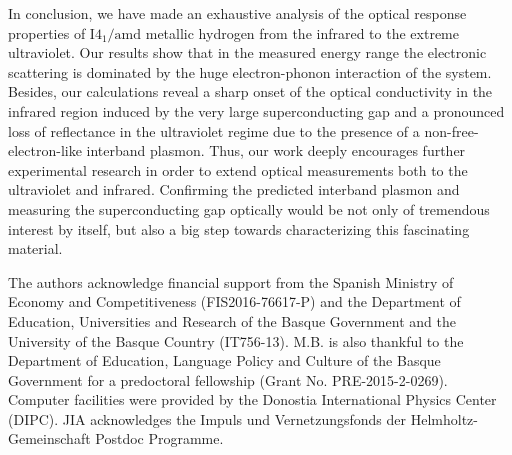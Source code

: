 \documentclass[%
 reprint,
superscriptaddress,
 amsmath,amssymb,
 aps,
prb,
floatfix,
]{revtex4-1}
\begin{document}


In conclusion, we have made an exhaustive analysis of the optical
response properties of $\mathrm{I4_1/amd}$ metallic hydrogen from the infrared to 
the extreme ultraviolet. Our results show that in the measured
energy range\cite{Diaseaal1579} the electronic scattering is dominated by the huge electron-phonon interaction
of the system. Besides, our calculations reveal a sharp onset of the optical conductivity in the infrared region
induced by the very large superconducting gap and a pronounced loss of reflectance in the ultraviolet regime due to 
the presence of a non-free-electron-like interband plasmon. 
Thus, our work deeply encourages further experimental research in order 
to extend optical measurements both to the ultraviolet and infrared. Confirming
the predicted interband plasmon and measuring the superconducting 
gap optically would be not only of tremendous interest by itself, but 
also a big step towards characterizing this fascinating material.  




\bigskip

The authors acknowledge financial support from the
Spanish Ministry of Economy and Competitiveness (FIS2016-76617-P) 
and the Department of Education, Universities and Research of the Basque 
Government and the University of the Basque Country (IT756-13).
M.B. is also thankful to the Department
of Education, Language Policy and Culture of the Basque
Government for a predoctoral fellowship (Grant No. PRE-2015-2-0269). 
Computer facilities were provided by the 
Donostia International Physics Center (DIPC). JIA acknowledges the Impuls und
Vernetzungsfonds der Helmholtz-Gemeinschaft Postdoc Programme.

\end{document}
